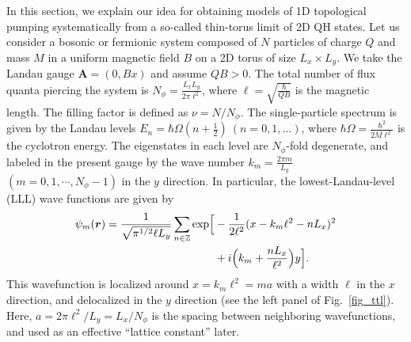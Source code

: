 \documentclass[aps,prb,twocolumn,superscriptaddress,showpacs,floatfix]{revtex4-1}
\newcommand{\bmr}{\bm{r}}
\begin{document}
In this section, we explain our idea for obtaining models of 1D topological pumping systematically from a so-called thin-torus limit of 2D QH states.\cite{TaoThouless, Seidel, Bergholtz1, Bergholtz2} Let us consider a bosonic or fermionic system composed of $N$ particles of charge $Q$ and mass $M$ in a uniform magnetic field $B$ on a 2D torus of size $L_x\times L_y$. 
We take the Landau gauge $\bm{A}=(0,Bx)$ and assume $QB>0$. 
The total number of flux quanta piercing the system is $N_\phi=\frac{L_xL_y}{2\pi\ell^2}$, where $\ell=\sqrt{\frac{\hbar}{QB}}$ is the magnetic length. 
The filling factor is defined as $\nu=N/N_\phi$. 
The single-particle spectrum is given by the Landau levels $E_n=\hbar\Omega(n+\frac{1}{2})~(n=0,1,\dots)$, where $\hbar\Omega=\frac{\hbar^2}{2M\ell^2}$ is the cyclotron energy. 
The eigenstates in each level are $N_\phi$-fold degenerate, and labeled in the present gauge by the wave number $k_m=\frac{2\pi m}{L_y}$ $(m=0,1, \cdots, N_\phi-1)$ in the $y$ direction. 
In particular, the lowest-Landau-level (LLL) wave functions are given by\cite{Yoshioka,Haldane2} 
\begin{align}
\psi_m(\bmr)=\frac{1}{\sqrt{\pi^{1/2}\ell L_y}}\sum_{n\in\mathbb{Z}}\exp\Bigl[&-\frac{1}{2\ell^2}(x-k_m\ell^2-nL_x)^2\notag\\
&+i\Bigl(k_m+\frac{nL_x}{\ell^2}\Bigr)y\Bigr].
\label{LLLWF}
\end{align}
This wavefunction is localized around $x=k_m\ell^2= ma$ with a width $\ell$ in the $x$ direction, and delocalized in the $y$ direction (see the left panel of Fig.\ \ref{fig_ttl}).  
Here, $a=2\pi\ell^2/L_y=L_x/N_\phi$ is the spacing between neighboring wavefunctions, and used as an effective ``lattice constant'' later. 
\end{document}

